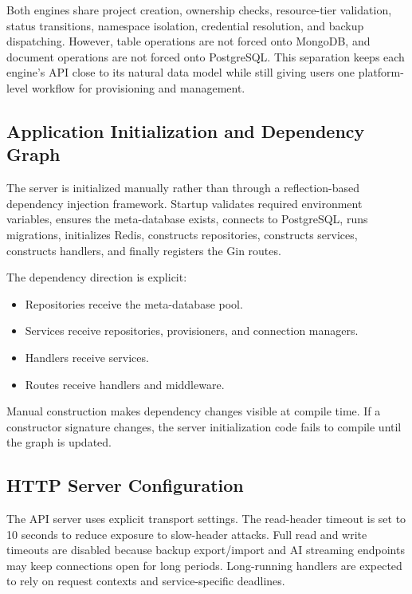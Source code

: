 Both engines share project creation, ownership checks, resource-tier validation, status transitions, namespace isolation, credential resolution, and backup dispatching. However, table operations are not forced onto MongoDB, and document operations are not forced onto PostgreSQL. This separation keeps each engine's API close to its natural data model while still giving users one platform-level workflow for provisioning and management.

\subsection{Application Initialization and Dependency Graph}

The server is initialized manually rather than through a reflection-based dependency injection framework. Startup validates required environment variables, ensures the meta-database exists, connects to PostgreSQL, runs migrations, initializes Redis, constructs repositories, constructs services, constructs handlers, and finally registers the Gin routes.

The dependency direction is explicit:

\begin{itemize}
    \item Repositories receive the meta-database pool.
    \item Services receive repositories, provisioners, and connection managers.
    \item Handlers receive services.
    \item Routes receive handlers and middleware.
\end{itemize}

Manual construction makes dependency changes visible at compile time. If a constructor signature changes, the server initialization code fails to compile until the graph is updated.

\subsection{HTTP Server Configuration}

The API server uses explicit transport settings. The read-header timeout is set to 10 seconds to reduce exposure to slow-header attacks. Full read and write timeouts are disabled because backup export/import and AI streaming endpoints may keep connections open for long periods. Long-running handlers are expected to rely on request contexts and service-specific deadlines.

